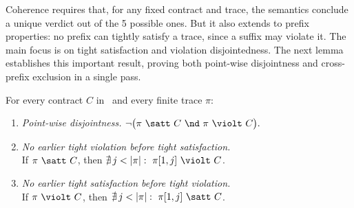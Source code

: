 Coherence requires that, for any fixed contract and trace, the semantics conclude a unique verdict out of the 5 possible ones. But it also extends to prefix properties: no prefix can tightly satisfy a trace, since a suffix may violate it. The main focus is on tight satisfaction and violation disjointedness. The next lemma establishes this important result, proving both point-wise disjointness and cross-prefix exclusion in a single pass.

\begin{lemma}
\label{lem:mutual prefix}
For every contract $C$ in \cDL\ and every finite trace $\pi$:
\begin{enumerate}
\item \emph{Point-wise disjointness.}
$\neg\bigl(\pi\ \satt\ C\ \nd\ \pi\ \violt\ C\bigr).$

\item \emph{No earlier tight violation before tight satisfaction.}\\[2pt]
If $\pi\ \satt\ C$, then $\nexists\,j<|\pi|:\ \pi[1,j]\ \violt\ C$.

\item \emph{No earlier tight satisfaction before tight violation.}\\[2pt]
If $\pi\ \violt\ C$, then $\nexists\,j<|\pi|:\ \pi[1,j]\ \satt\ C$.
\end{enumerate}
\end{lemma}

